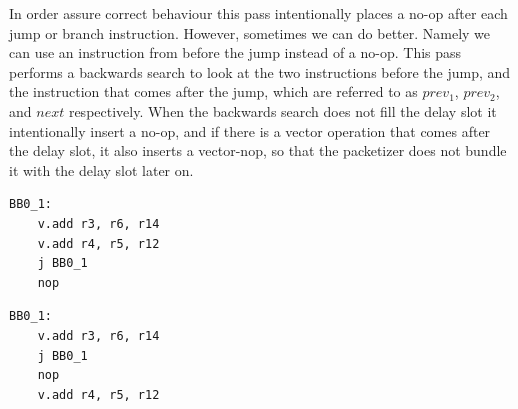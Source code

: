 In order assure correct behaviour this pass intentionally 
places a no-op after each jump or branch instruction. However, sometimes we can do better. Namely we can use an instruction from before the jump instead of a no-op. This pass performs a backwards search to look at the two instructions before the jump, and the instruction that comes after the jump, which are referred to as $prev_1$, $prev_2$, and $next$ respectively. When the backwards search does not fill the delay slot it intentionally insert a no-op, and if there is a vector operation that comes after the delay slot, it also inserts a vector-nop, so that the packetizer does not bundle it with the delay slot later on.



\label{lst:delayslot1}
\begin{center}
\hspace{2px}\begin{minipage}{.475\textwidth}
\begin{lstlisting}[frame=tlrb]
BB0_1:
    v.add r3, r6, r14
    v.add r4, r5, r12
    j BB0_1
    nop
\end{lstlisting}
\end{minipage}\hfill
\begin{minipage}{.475\textwidth}
\begin{lstlisting}[frame=tlrb]
BB0_1:
    v.add r3, r6, r14
    j BB0_1
    nop
    v.add r4, r5, r12
\end{lstlisting}
\end{minipage}
\end{center}

